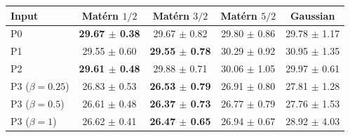 \begin{tabular}{lcccc}
\toprule
Input & Mat\'ern $1/2$ & Mat\'ern $3/2$ & Mat\'ern $5/2$ & Gaussian \\
\midrule
P0 & \textbf{29.67 $\pm$ 0.38} & 29.67 $\pm$ 0.82 & 29.80 $\pm$ 0.86 & 29.78 $\pm$ 1.17 \\
P1 & 29.55 $\pm$ 0.60 & \textbf{29.55 $\pm$ 0.78} & 30.29 $\pm$ 0.92 & 30.95 $\pm$ 1.35 \\
P2 & \textbf{29.61 $\pm$ 0.48} & 29.88 $\pm$ 0.71 & 30.06 $\pm$ 1.05 & 29.97 $\pm$ 0.61 \\
P3 ($\beta = 0.25$) & 26.83 $\pm$ 0.53 & \textbf{26.53 $\pm$ 0.79} & 26.91 $\pm$ 0.80 & 27.81 $\pm$ 1.28 \\
P3 ($\beta = 0.5$) & 26.61 $\pm$ 0.48 & \textbf{26.37 $\pm$ 0.73} & 26.77 $\pm$ 0.79 & 27.76 $\pm$ 1.53 \\
P3 ($\beta = 1$) & 26.62 $\pm$ 0.41 & \textbf{26.47 $\pm$ 0.65} & 26.94 $\pm$ 0.67 & 28.92 $\pm$ 4.03 \\
\bottomrule
\end{tabular}
